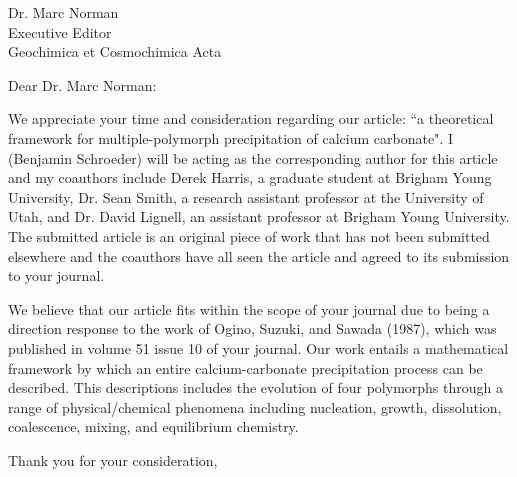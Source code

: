 \documentclass{letter}
\begin{document}
\begin{letter} {Dr. Marc Norman \\
					   Executive Editor \\ 
					   Geochimica et Cosmochimica Acta}

\opening{Dear Dr. Marc Norman:}
We appreciate your time and consideration regarding our article: ``a theoretical framework for multiple-polymorph precipitation of calcium carbonate".  I (Benjamin Schroeder) will be acting as the corresponding author for this article and my coauthors include Derek Harris, a graduate student at Brigham Young University, Dr. Sean Smith, a research assistant professor at the University of Utah, and Dr. David Lignell, an assistant professor at Brigham Young University.  The submitted article is an original piece of work that has not been submitted elsewhere and the coauthors have all seen the article and agreed to its submission to your journal. 

We believe that our article fits within the scope of your journal due to being a direction response to the work of Ogino, Suzuki, and Sawada (1987), which was published in volume 51 issue 10 of your journal.  Our work entails a mathematical framework by which an entire calcium-carbonate precipitation process can be described.  This descriptions includes the evolution of four polymorphs through a range of physical/chemical phenomena including nucleation, growth, dissolution, coalescence, mixing, and equilibrium chemistry. 

\closing{Thank you for your consideration,}

\end{letter}
\end{document}
